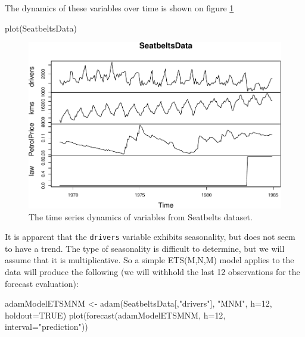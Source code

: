 \documentclass[
]{book}
\newenvironment{Shaded}{\begin{snugshade}}{\end{snugshade}}
\newcommand{\AttributeTok}[1]{\textcolor[rgb]{0.77,0.63,0.00}{#1}}
\newcommand{\ConstantTok}[1]{\textcolor[rgb]{0.00,0.00,0.00}{#1}}
\newcommand{\DecValTok}[1]{\textcolor[rgb]{0.00,0.00,0.81}{#1}}
\newcommand{\FunctionTok}[1]{\textcolor[rgb]{0.00,0.00,0.00}{#1}}
\newcommand{\NormalTok}[1]{#1}
\newcommand{\OtherTok}[1]{\textcolor[rgb]{0.56,0.35,0.01}{#1}}
\newcommand{\StringTok}[1]{\textcolor[rgb]{0.31,0.60,0.02}{#1}}
\theoremstyle{definition}
\theoremstyle{definition}
\theoremstyle{definition}
\theoremstyle{definition}
\theoremstyle{remark}
\begin{document}
The dynamics of these variables over time is shown on figure \ref{fig:Seatbelts}

\begin{Shaded}
\begin{Highlighting}[]
\FunctionTok{plot}\NormalTok{(SeatbeltsData)}
\end{Highlighting}
\end{Shaded}

\begin{figure}
\centering
\includegraphics{adam_files/figure-latex/Seatbelts-1.pdf}
\caption{\label{fig:Seatbelts}The time series dynamics of variables from Seatbelts dataset.}
\end{figure}

It is apparent that the \texttt{drivers} variable exhibits seasonality, but does not seem to have a trend. The type of seasonality is difficult to determine, but we will assume that it is multiplicative. So a simple ETS(M,N,M) model applies to the data will produce the following (we will withhold the last 12 observations for the forecast evaluation):

\begin{Shaded}
\begin{Highlighting}[]
\NormalTok{adamModelETSMNM }\OtherTok{\textless{}{-}} \FunctionTok{adam}\NormalTok{(SeatbeltsData[,}\StringTok{"drivers"}\NormalTok{], }\StringTok{"MNM"}\NormalTok{,}
                        \AttributeTok{h=}\DecValTok{12}\NormalTok{, }\AttributeTok{holdout=}\ConstantTok{TRUE}\NormalTok{)}
\FunctionTok{plot}\NormalTok{(}\FunctionTok{forecast}\NormalTok{(adamModelETSMNM, }\AttributeTok{h=}\DecValTok{12}\NormalTok{, }\AttributeTok{interval=}\StringTok{"prediction"}\NormalTok{))}
\end{Highlighting}
\end{Shaded}
\end{document}
